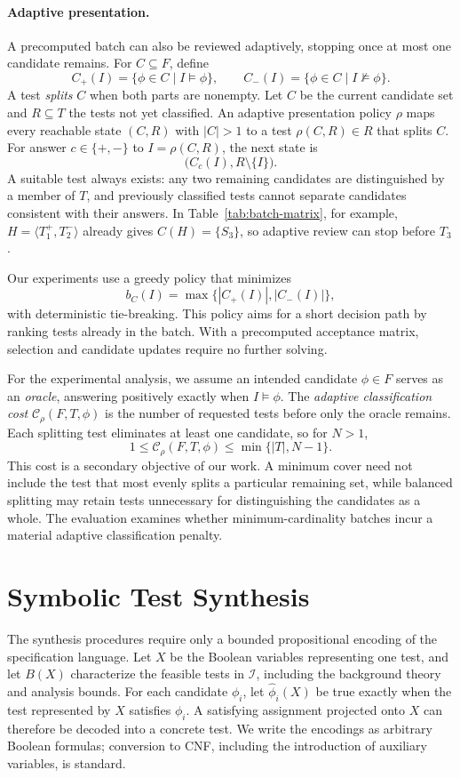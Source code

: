 \documentclass[runningheads]{llncs}
\begin{document}
\paragraph{Adaptive presentation.}
A precomputed batch can also be reviewed adaptively, stopping once at most one
candidate remains. For $C\subseteq F$, define
\[
  C_+(I)=\{\phi\in C\mid I\models\phi\},\qquad
  C_-(I)=\{\phi\in C\mid I\not\models\phi\}.
\]
A test \emph{splits} $C$ when both parts are nonempty. Let $C$ be the current
candidate set and $R\subseteq T$ the tests not yet classified. An adaptive
presentation policy $\rho$ maps every reachable state $(C,R)$ with $|C|>1$
to a test $\rho(C,R)\in R$ that splits $C$. For answer $c\in\{+,-\}$ to
$I=\rho(C,R)$, the next state is
\[
  \bigl(C_c(I),R\setminus\{I\}\bigr).
\]
A suitable test always exists: any two remaining candidates are distinguished
by a member of $T$, and previously classified tests cannot separate candidates
consistent with their answers. In Table~\ref{tab:batch-matrix}, for example,
$H=\langle T_1^+,T_2^-\rangle$ already gives $C(H)=\{S_3\}$, so adaptive
review can stop before $T_3$.

Our experiments use a greedy policy that minimizes
\[
  b_C(I)=\max\{|C_+(I)|,|C_-(I)|\},
\]
with deterministic tie-breaking. This policy aims for a short decision path
by ranking tests already in the batch. With a precomputed acceptance matrix,
selection and candidate updates require no further solving.

For the experimental analysis, we assume an intended candidate $\phi\in F$
serves as an \emph{oracle}, answering positively exactly when
$I\models\phi$. The \emph{adaptive classification cost}
$\mathcal C_\rho(F,T,\phi)$ is the number of requested tests before only the
oracle remains. Each splitting test eliminates at least one candidate, so
for $N>1$,
\[
  1\leq\mathcal C_\rho(F,T,\phi)\leq\min\{|T|,N-1\}.
\]
This cost is a secondary objective of our work. A minimum cover need not include the test
that most evenly splits a particular remaining set, while balanced splitting
may retain tests unnecessary for distinguishing the candidates as a whole.
The evaluation examines whether minimum-cardinality batches incur a material
adaptive classification penalty.

\section{Symbolic Test Synthesis}
\label{sec:synthesis}

The synthesis procedures require only a bounded propositional encoding of the
specification language. Let $X$ be the Boolean variables representing one test,
and let $B(X)$ characterize the feasible tests in $\mathcal I$, including the
background theory and analysis bounds. For each candidate $\phi_i$, let
$\widehat{\phi}_i(X)$ be true exactly when the test represented by $X$ satisfies
$\phi_i$. A satisfying assignment projected onto $X$ can therefore be decoded
into a concrete test. We write the encodings as arbitrary Boolean formulas;
conversion to CNF, including the introduction of auxiliary variables, is
standard.
\end{document}
